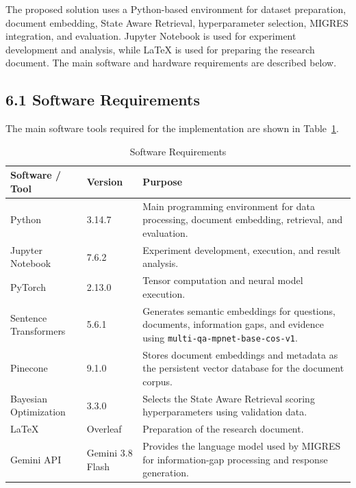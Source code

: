 \documentclass[12pt,a4paper]{report}
\begin{document}
\justifying

The proposed solution uses a Python-based environment for dataset
preparation, document embedding, State Aware Retrieval, hyperparameter
selection, MIGRES integration, and evaluation. Jupyter Notebook is used
for experiment development and analysis, while LaTeX is used for
preparing the research document. The main software and hardware
requirements are described below.

\subsection*{6.1 Software Requirements}

The main software tools required for the implementation are shown in
Table~\ref{tab:software-requirements}.

\begin{table}[H]
\centering
\caption{Software Requirements}
\label{tab:software-requirements}
\renewcommand{\arraystretch}{1.2}
\begin{tabular}{|p{1.65in}|p{1.45in}|p{2.95in}|}
\hline
\textbf{Software / Tool} & \textbf{Version} & \textbf{Purpose} \\ \hline

Python & 3.14.7 &
Main programming environment for data processing, document embedding,
retrieval, and evaluation. \\ \hline

Jupyter Notebook & 7.6.2 &
Experiment development, execution, and result analysis. \\ \hline

PyTorch & 2.13.0 &
Tensor computation and neural model execution. \\ \hline

Sentence Transformers & 5.6.1 &
Generates semantic embeddings for questions, documents, information
gaps, and evidence using
\texttt{multi-qa-mpnet-base-cos-v1}. \\ \hline

Pinecone & 9.1.0 &
Stores document embeddings and metadata as the persistent vector
database for the document corpus. \\ \hline

Bayesian Optimization & 3.3.0 &
Selects the State Aware Retrieval scoring hyperparameters using
validation data. \\ \hline

LaTeX & Overleaf &
Preparation of the research document. \\ \hline

Gemini API & Gemini 3.8 Flash &
Provides the language model used by MIGRES for information-gap
processing and response generation. \\ \hline

\end{tabular}
\end{table}
\end{document}

